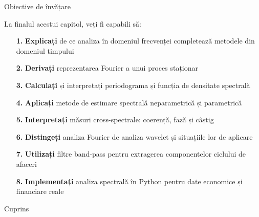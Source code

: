 \documentclass[9pt, aspectratio=169, t]{beamer}
\subtitle{Capitolul 12: Analiză Spectrală și Metode în Domeniul Frecvenței}
\begin{document}
{
\begin{frame}
    \titlepage
\end{frame}
}

\begin{frame}{Obiective de învățare}
    \begin{cminipage}{0.95\textwidth}
    \begin{block}{La finalul acestui capitol, veți fi capabili să:}
        \begin{itemize}\setlength{\itemsep}{2pt}
            \item[\textcolor{MainBlue}{\textbf{1.}}] \textbf{Explicați} de ce analiza în domeniul frecvenței completează metodele din domeniul timpului
            \item[\textcolor{MainBlue}{\textbf{2.}}] \textbf{Derivați} reprezentarea Fourier a unui proces staționar
            \item[\textcolor{MainBlue}{\textbf{3.}}] \textbf{Calculați} și interpretați periodograma și funcția de densitate spectrală
            \item[\textcolor{MainBlue}{\textbf{4.}}] \textbf{Aplicați} metode de estimare spectrală neparametrică și parametrică
            \item[\textcolor{MainBlue}{\textbf{5.}}] \textbf{Interpretați} măsuri cross-spectrale: coerență, fază și câștig
            \item[\textcolor{MainBlue}{\textbf{6.}}] \textbf{Distingeți} analiza Fourier de analiza wavelet și situațiile lor de aplicare
            \item[\textcolor{MainBlue}{\textbf{7.}}] \textbf{Utilizați} filtre band-pass pentru extragerea componentelor ciclului de afaceri
            \item[\textcolor{MainBlue}{\textbf{8.}}] \textbf{Implementați} analiza spectrală în Python pentru date economice și financiare reale
        \end{itemize}
    \end{block}
    \end{cminipage}
\end{frame}

\begin{frame}{Cuprins}
    \vspace{-0.3cm}
    {\small
    \tableofcontents
    }
\end{frame}
\end{document}
